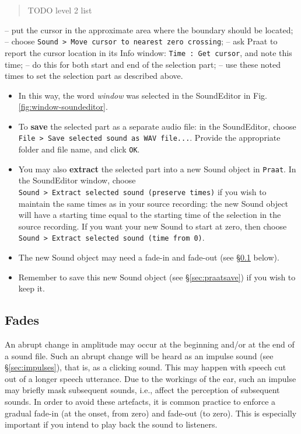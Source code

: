 \documentclass[
]{book}
\begin{document}
\begin{quote}
TODO level 2 list
\end{quote}

-- put the cursor in the approximate area where the boundary should be located;
-- choose \texttt{Sound\ \textgreater{}\ Move\ cursor\ to\ nearest\ zero\ crossing};
-- ask Praat to report the cursor location in its Info window: \texttt{Time\ :\ Get\ cursor}, and note this time;
-- do this for both start and end of the selection part;
-- use these noted times to set the selection part as described above.

\begin{itemize}
\item
  In this way, the word \emph{window} was selected in the SoundEditor in Fig.\ref{fig:window-soundeditor}.
\item
  To \textbf{save} the selected part as a separate audio file: in the SoundEditor, choose \texttt{File\ \textgreater{}\ Save\ selected\ sound\ as\ WAV\ file...}.
  Provide the appropriate folder and file name, and click \texttt{OK}.
\item
  You may also \textbf{extract} the selected part into a new Sound object in \texttt{Praat}. In the SoundEditor window, choose \texttt{Sound\ \textgreater{}\ Extract\ selected\ sound\ (preserve\ times)} if you wish to maintain the same times as in your source recording: the new Sound object will have a starting time equal to the starting time of the selection in the source recording. If you want your new Sound to start at zero, then choose \texttt{Sound\ \textgreater{}\ Extract\ selected\ sound\ (time\ from\ 0)}.
\item
  The new Sound object may need a fade-in and fade-out (see §\ref{sec:fades} below).
\item
  Remember to save this new Sound object (see §\ref{sec:praatsave}) if you wish to keep it.
\end{itemize}

\label{fades}
\subsection{Fades}\label{sec:fades}

An abrupt change in amplitude may occur at the beginning and/or at the end of a sound file. Such an abrupt change will be heard as an impulse sound (see §\ref{sec:impulses}), that is, as a clicking sound. This may happen with speech cut out of a longer speech utterance.
Due to the workings of the ear, such an impulse may briefly mask subsequent sounds, i.e., affect the perception of subsequent sounds. In order to avoid these artefacts, it is common practice to enforce a gradual fade-in (at the onset, from zero) and fade-out (to zero). This is especially important if you intend to play back the sound to listeners.
\end{document}
